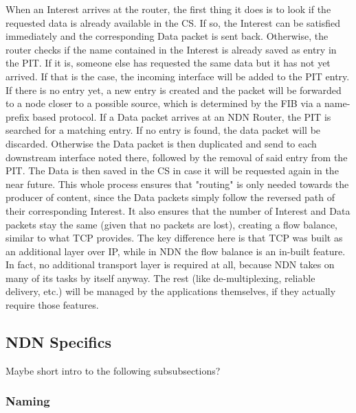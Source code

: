 When an Interest arrives at the router, the first thing it does is to look if the requested data is already available in the CS. If so, the Interest can be satisfied immediately and the corresponding Data packet is sent back. Otherwise, the router checks if the name contained in the Interest is already saved as entry in the PIT. If it is, someone else has requested the same data but it has not yet arrived. If that is the case, the incoming interface will be added to the PIT entry. If there is no entry yet, a new entry is created and the packet will be forwarded to a node closer to a possible source, which is determined by the FIB via a name-prefix based protocol. If a Data packet arrives at an NDN Router, the PIT is searched for a matching entry. If no entry is found, the data packet will be discarded. Otherwise the Data packet is then duplicated and send to each downstream interface noted there, followed by the removal of said entry from the PIT. The Data is then saved in the CS in case it will be requested again in the near future. This whole process ensures that "routing" is only needed towards the producer of content, since the Data packets simply follow the reversed path of their corresponding Interest. It also ensures that the number of Interest and Data packets stay the same (given that no packets are lost), creating a flow balance, similar to what TCP provides. The key difference here is that TCP was built as an additional layer over IP, while in NDN the flow balance is an in-built feature. In fact, no additional transport layer is required at all, because NDN takes on many of its tasks by itself anyway. The rest (like de-multiplexing, reliable delivery, etc.) will be managed by the applications themselves, if they actually require those features. \cite{ZABJ14}


\subsection{NDN Specifics}
Maybe short intro to the following subsubsections?

\subsubsection{Naming}

